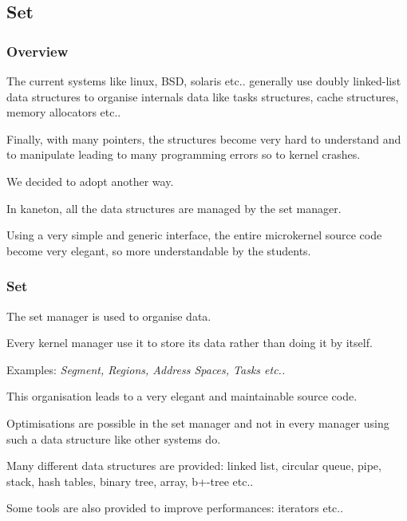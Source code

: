 %
%

\subsection{Set}


\begin{frame}
  \frametitle{Overview}

  The current systems like linux, BSD, solaris etc.. generally use
  doubly linked-list data structures to organise internals data like
  tasks structures, cache structures, memory allocators etc..

  \nl

  Finally, with many pointers, the structures become very hard to understand
  and to manipulate leading to many programming errors so to kernel
  crashes.

  \nl

  We decided to adopt another way.

  \nl

  In kaneton, all the data structures are managed by the set manager.

  \nl

  Using a very simple and generic interface, the entire microkernel source
  code become very elegant, so more understandable by the students.
\end{frame}


\begin{frame}
  \frametitle{Set}

  The set manager is used to organise data.

  \nl

  Every kernel manager use it to store its data rather than doing it
  by itself.

  \nl

  Examples: \textit{Segment, Regions, Address Spaces, Tasks etc..}

  \nl

  This organisation leads to a very elegant and maintainable source code.

  \nl

  Optimisations are possible in the set manager and not in every
  manager using such a data structure like other systems do.

  \nl

  Many different data structures are provided: linked list, circular
  queue, pipe, stack, hash tables, binary tree, array, b+-tree etc..

  \nl

  Some tools are also provided to improve performances: iterators etc..
\end{frame}


